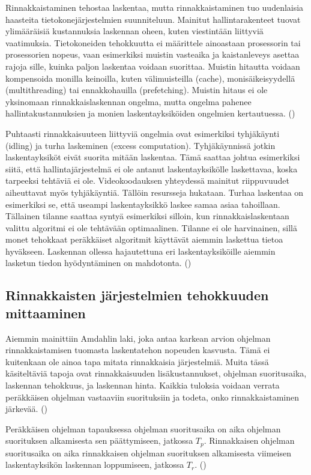 Rinnakkaistaminen tehostaa laskentaa, mutta rinnakkaistaminen tuo
uudenlaisia haasteita tietokonejärjestelmien suunniteluun. Mainitut
hallintarakenteet tuovat ylimääräisiä kustannuksia laskennan oheen,
kuten viestintään liittyviä vaatimuksia.
Tietokoneiden tehokkuutta ei määrittele ainoastaan prosessorin tai
prosessorien nopeus, vaan esimerkiksi muistin vasteaika ja kaistanleveys
asettaa rajoja sille, kuinka paljon laskentaa voidaan suorittaa. Muistin
hitautta voidaan kompensoida monilla keinoilla, kuten välimuisteilla (cache),
monisäikeisyydellä (multithreading) tai ennakkohauilla (prefetching). Muistin
hitaus ei ole yksinomaan rinnakkaislaskennan ongelma, mutta ongelma pahenee
hallintakustannuksien ja monien laskentayksiköiden ongelmien kertautuessa.
(\citealt{intro})

Puhtaasti rinnakkaisuuteen liittyviä ongelmia ovat esimerkiksi tyhjäkäynti
(idling) ja turha laskeminen (excess computation). Tyhjäkäynnissä jotkin
laskentayksiköt eivät suorita mitään laskentaa. Tämä saattaa johtua esimerkiksi
siitä, että hallintajärjestelmä ei ole antanut laskentayksikölle laskettavaa,
koska tarpeeksi tehtäviä ei ole. Videokoodauksen yhteydessä mainitut
riippuvuudet aiheuttavat myös tyhjäkäyntiä. Tällöin resursseja hukataan. Turhaa
laskentaa on esimerkiksi se, että useampi laskentayksikkö laskee samaa asiaa
tahoillaan. Tällainen tilanne saattaa syntyä esimerkiksi silloin, kun
rinnakkaislaskentaan valittu algoritmi ei ole tehtävään optimaalinen. Tilanne
ei ole harvinainen, sillä monet tehokkaat peräkkäiset algoritmit käyttävät
aiemmin laskettua tietoa hyväkseen. Laskennan ollessa hajautettuna eri
laskentayksiköille aiemmin lasketun tiedon hyödyntäminen on mahdotonta.
(\citealt{intro})

\subsection{Rinnakkaisten järjestelmien tehokkuuden mittaaminen}

Aiemmin mainittiin Amdahlin laki, joka antaa karkean arvion ohjelman
rinnakkaistamisen tuomasta laskentatehon nopeuden kasvusta. Tämä ei kuitenkaan
ole ainoa tapa mitata rinnakkaisia järjestelmiä. Muita tässä käsiteltäviä tapoja
ovat rinnakkaisuuden lisäkustannukset, ohjelman suoritusaika, laskennan
tehokkuus, ja laskennan hinta. Kaikkia tuloksia voidaan verrata peräkkäisen
ohjelman vastaaviin suorituksiin ja todeta, onko rinnakkaistaminen järkevää.
(\citealt{intro})

Peräkkäisen ohjelman tapauksessa ohjelman suoritusaika on aika ohjelman
suorituksen alkamisesta sen päättymiseen, jatkossa $T_p$. Rinnakkaisen
ohjelman suoritusaika on aika rinnakkaisen ohjelman suorituksen alkamisesta
viimeisen laskentayksikön laskennan loppumiseen, jatkossa $T_r$. (\citealt{intro})

